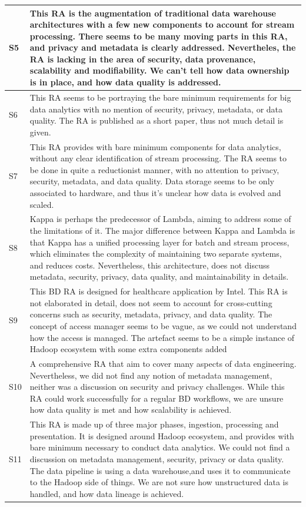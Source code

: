 \documentclass{ieeeaccess}
\begin{document}
\begin{table}
\begin{tabular}{|p{0.3cm}|p{16.8cm}|}
        \hline
        S5 & This RA is the augmentation of traditional data warehouse architectures with a few new components to account for stream processing. There seems to be many moving parts in this RA, and privacy and metadata is clearly addressed. Nevertheles, the RA is lacking in the area of security, data provenance, scalability and modifiability. We can't tell how data ownership is in place, and how data quality is addressed. \\
        \hline
        S6 & This RA seems to be portraying the bare minimum requirements for big data analytics with no mention of security, privacy, metadata, or data quality. The RA is published as a short paper, thus not much detail is given. \\
        \hline
        S7 & This RA provides with bare minimum components for data analytics, without any clear identification of stream processing. The RA seems to be done in quite a reductionist manner, with no attention to privacy, security, metadata, and data quality. Data storage seems to be only associated to hardware, and thus it's unclear how data is evolved and scaled.  \\
        \hline
        S8 & Kappa is perhaps the predecessor of Lambda, aiming to address some of the limitations of it. The major difference between Kappa and Lambda is that Kappa has a unified processing layer for batch and stream process, which eliminates the complexity of maintaining two separate systems, and reduces costs. Nevertheless, this architecture, does not discuss metadata, security, privacy, data quality, and maintainability in details.  \\
        \hline
        S9 & This BD RA is designed for healthcare application by Intel. This RA is not elaborated in detail, does not seem to account for cross-cutting concerns such as security, metadata, privacy, and data quality. The concept of access manager seems to be vague, as we could not understand how the access is managed. The artefact seems to be a simple instance of Hadoop ecosystem with some extra components added   \\
        \hline
        S10 & A comprehensive RA that aim to cover many aspects of data engineering. Nevertheless, we did not find any notion of metadata management, neither was a discussion on security and privacy challenges. While this RA could work successfully for a regular BD workflows, we are unsure how data quality is met and how scalability is achieved.  \\
        \hline
        S11 & This RA is made up of three major phases, ingestion, processing and presentation. It is designed around Hadoop ecosystem, and provides with bare minimum necessary to conduct data analytics. We could not find a discussion on metadata management, security, privacy or data quality. The data pipeline is using a data warehouse,and uses it to communicate to the Hadoop side of things. We are not sure how unstructured data is handled, and how data lineage is achieved.  \\

\end{tabular}
\end{table}
\end{document}
